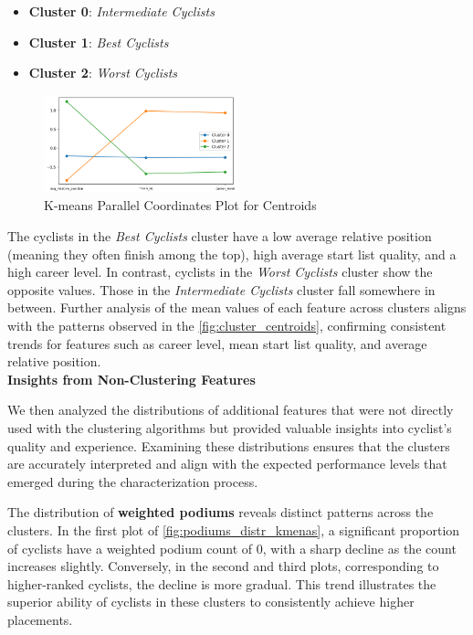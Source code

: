 \begin{itemize}
    \item \textbf{Cluster 0}: \textit{Intermediate Cyclists}
    \vspace{-0.2cm}
    \item \textbf{Cluster 1}: \textit{Best Cyclists}
    \vspace{-0.2cm}
    \item \textbf{Cluster 2}: \textit{Worst Cyclists}
\end{itemize}

\vspace{-0.2cm}


\begin{figure}[H]
\centering
\includegraphics[width=0.5\textwidth]{images/CLUSTER/k-means/Centroids_plot.png}
\caption{ \small \small K-means Parallel Coordinates Plot for Centroids}
\label{fig:cluster_centroids}
\end{figure}

\noindent
The cyclists in the \textit{Best Cyclists} cluster have a low average relative position (meaning they often finish among the top), high average start list quality, and a high career level. In contrast, cyclists in the \textit{Worst Cyclists} cluster show the opposite values. Those in the \textit{Intermediate Cyclists} cluster fall somewhere in between.
Further analysis of the mean values of each feature across clusters aligns with the patterns observed in the \autoref{fig:cluster_centroids}, confirming consistent trends for features such as career level, mean start list quality, and average relative position.\\

\noindent
\textbf{Insights from Non-Clustering Features}

\noindent
We then analyzed the distributions of additional features that were not directly used with the clustering algorithms but provided valuable insights into cyclist's quality and experience. Examining these distributions ensures that the clusters are accurately interpreted and align with the expected performance levels that emerged during the characterization process.

The distribution of \textbf{weighted podiums} reveals distinct patterns across the clusters. In the first plot of \autoref{fig:podiums_distr_kmenas}, a significant proportion of cyclists have a weighted podium count of 0, with a sharp decline as the count increases slightly. Conversely, in the second and third plots, corresponding to higher-ranked cyclists, the decline is more gradual. This trend illustrates the superior ability of cyclists in these clusters to consistently achieve higher placements.  

